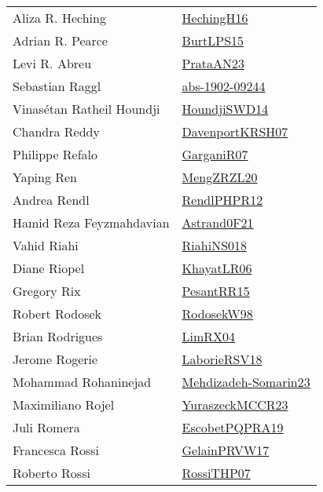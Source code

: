 {\begin{longtable}{p{4cm}p{20cm}}
Aliza R. Heching & \href{papers/HechingH16.pdf}{HechingH16}\cite{HechingH16} \\
Adrian R. Pearce & \href{papers/BurtLPS15.pdf}{BurtLPS15}\cite{BurtLPS15} \\
Levi R. Abreu & \href{articles/PrataAN23.pdf}{PrataAN23}\cite{PrataAN23} \\
Sebastian Raggl & \href{articles/abs-1902-09244.pdf}{abs-1902-09244}\cite{abs-1902-09244} \\
Vinas{\'{e}}tan Ratheil Houndji & \href{papers/HoundjiSWD14.pdf}{HoundjiSWD14}\cite{HoundjiSWD14} \\
Chandra Reddy & \href{papers/DavenportKRSH07.pdf}{DavenportKRSH07}\cite{DavenportKRSH07} \\
Philippe Refalo & \href{papers/GarganiR07.pdf}{GarganiR07}\cite{GarganiR07} \\
Yaping Ren & \href{articles/MengZRZL20.pdf}{MengZRZL20}\cite{MengZRZL20} \\
Andrea Rendl & \href{papers/RendlPHPR12.pdf}{RendlPHPR12}\cite{RendlPHPR12} \\
Hamid Reza Feyzmahdavian & \href{papers/Astrand0F21.pdf}{Astrand0F21}\cite{Astrand0F21} \\
Vahid Riahi & \href{papers/RiahiNS018.pdf}{RiahiNS018}\cite{RiahiNS018} \\
Diane Riopel & \href{articles/KhayatLR06.pdf}{KhayatLR06}\cite{KhayatLR06} \\
Gregory Rix & \href{papers/PesantRR15.pdf}{PesantRR15}\cite{PesantRR15} \\
Robert Rodosek & \href{papers/RodosekW98.pdf}{RodosekW98}\cite{RodosekW98} \\
Brian Rodrigues & \href{papers/LimRX04.pdf}{LimRX04}\cite{LimRX04} \\
Jerome Rogerie & \href{articles/LaborieRSV18.pdf}{LaborieRSV18}\cite{LaborieRSV18} \\
Mohammad Rohaninejad & \href{papers/Mehdizadeh-Somarin23.pdf}{Mehdizadeh-Somarin23}\cite{Mehdizadeh-Somarin23} \\
Maximiliano Rojel & \href{articles/YuraszeckMCCR23.pdf}{YuraszeckMCCR23}\cite{YuraszeckMCCR23} \\
Juli Romera & \href{articles/EscobetPQPRA19.pdf}{EscobetPQPRA19}\cite{EscobetPQPRA19} \\
Francesca Rossi & \href{papers/GelainPRVW17.pdf}{GelainPRVW17}\cite{GelainPRVW17} \\
Roberto Rossi & \href{papers/RossiTHP07.pdf}{RossiTHP07}\cite{RossiTHP07} \\

\end{longtable}}
